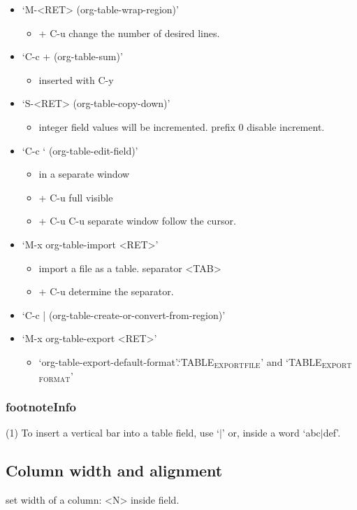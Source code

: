 \documentclass[11pt]{article}
\begin{document}
\begin{itemize}
\item ‘M-<RET>     (org-table-wrap-region)’
\begin{itemize}
\item + C-u change the number of desired lines.
\end{itemize}
\item ‘C-c +     (org-table-sum)’
\begin{itemize}
\item inserted with C-y
\end{itemize}
\item ‘S-<RET>     (org-table-copy-down)’
\begin{itemize}
\item integer field values will be incremented. prefix 0 disable increment.
\end{itemize}
\item ‘C-c `     (org-table-edit-field)’
\begin{itemize}
\item in a separate window
\item + C-u full visible
\item + C-u C-u separate window follow the cursor.
\end{itemize}
\item ‘M-x org-table-import <RET>’
\begin{itemize}
\item import a file as a table. separator <TAB>
\item + C-u determine the separator.
\end{itemize}
\item ‘C-c |     (org-table-create-or-convert-from-region)’
\item ‘M-x org-table-export <RET>’
\begin{itemize}
\item ‘org-table-export-default-format’.‘TABLE\(_{\text{EXPORT}}\)\(_{\text{FILE}}\)’ and ‘TABLE\(_{\text{EXPORT}}\)\(_{\text{FORMAT}}\)’
\end{itemize}
\end{itemize}
\subsubsection{footnoteInfo}
\label{sec:orgd149ae1}
(1) To insert a vertical bar into a table field, use ‘\(\vert{}\)’ or,
inside a word ‘abc\(\vert{}\)def’.
\subsection{Column width and alignment}
\label{sec:orgb3d6ada}
set width of a column:
<N>
inside field.
\end{document}
